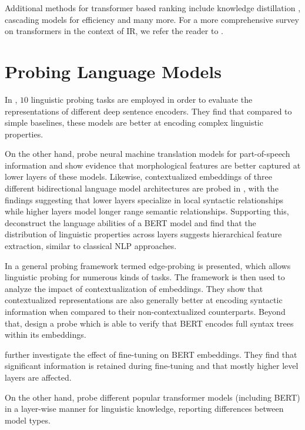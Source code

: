 Additional methods for transformer based ranking include knowledge distillation \citep{DBLP:journals/corr/abs-2009-07531, DBLP:journals/corr/abs-2010-02666}, cascading models for efficiency \citep{Nogueira2019MultiStageDR} and many more. For a more comprehensive survey on transformers in the context of IR, we refer the reader to \citep{10.1145/3437963.3441667}.

\section{Probing Language Models}
In \citep{conneau-etal-2018-cram}, $10$ linguistic probing tasks are employed in order to evaluate the representations of different deep sentence encoders. They find that compared to simple baselines, these models are better at encoding complex linguistic properties.

On the other hand, \citep{Belinkov2017WhatDN} probe neural machine translation models for part-of-speech information and show evidence that morphological features are better captured at lower layers of these models. Likewise, contextualized embeddings of three different bidirectional language model architectures are probed in \citep{peters-etal-2018-dissecting}, with the findings suggesting that lower layers specialize in local syntactic relationships while higher layers model longer range semantic relationships. Supporting this, \citep{tenney-etal-2019-bert} deconstruct the language abilities of a BERT model and find that the distribution of linguistic properties across layers suggests hierarchical feature extraction, similar to classical NLP approaches.

In \citep{Tenney2019WhatDY} a general probing framework termed edge-probing is presented, which allows linguistic probing for numerous kinds of tasks. The framework is then used to analyze the impact of contextualization of embeddings. They show that contextualized representations are also generally better at encoding syntactic information when compared to their non-contextualized counterparts. Beyond that, \citep{Hewitt2019ASP} design a probe which is able to verify that BERT encodes full syntax trees within its embeddings.

\citep{merchant-etal-2020-happens} further investigate the effect of fine-tuning on BERT embeddings. They find that significant information is retained during fine-tuning and that mostly higher level layers are affected.

On the other hand, \citep{Fayyaz2021NotAM} probe different popular transformer models (including BERT) in a layer-wise manner for linguistic knowledge, reporting differences between model types.

